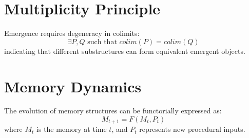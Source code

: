 \documentclass{article}
\begin{document}
\section{Multiplicity Principle}
Emergence requires degeneracy in colimits:
\begin{equation}
    \exists P, Q \text{ such that } colim(P) = colim(Q) 
\end{equation}
indicating that different substructures can form equivalent emergent objects.

\section{Memory Dynamics}
The evolution of memory structures can be functorially expressed as:
\begin{equation}
    M_{t+1} = F(M_t, P_t)
\end{equation}
where $M_t$ is the memory at time $t$, and $P_t$ represents new procedural inputs.
\end{document}
